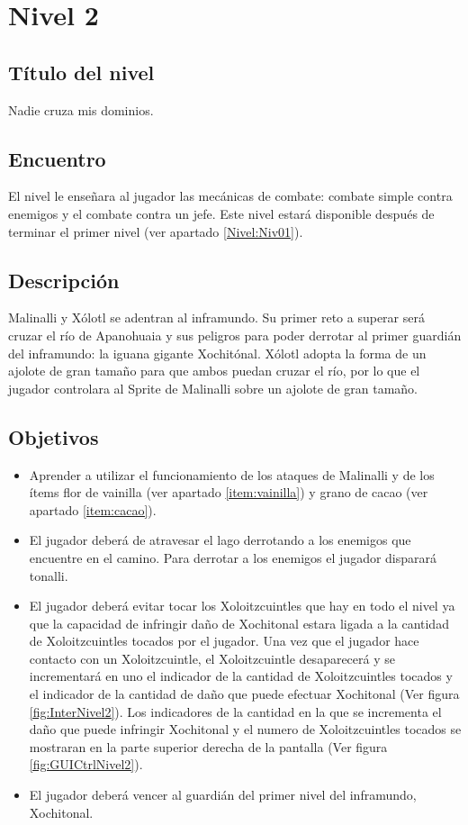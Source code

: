 \section{Nivel 2} \label{Nivel:Niv02}
	\subsection{Título del nivel}
	Nadie cruza mis dominios.
	\subsection{Encuentro}
El nivel le enseñara al jugador las mecánicas de combate: combate simple contra enemigos y el combate contra un jefe. Este nivel estará disponible después de terminar el primer nivel (ver apartado \ref{Nivel:Niv01}).
	\subsection{Descripción}
Malinalli y Xólotl se adentran al inframundo. Su primer reto a superar será cruzar el río de Apanohuaia y sus peligros para poder derrotar al primer guardián del inframundo: la iguana gigante Xochitónal. Xólotl adopta la forma de un ajolote de gran tamaño para que ambos puedan cruzar el río, por lo que el jugador controlara al Sprite de Malinalli sobre un ajolote de gran tamaño. 
	\subsection{Objetivos}
\begin{itemize}
	\item Aprender a utilizar el funcionamiento de los ataques de Malinalli y de los ítems flor de vainilla (ver apartado \ref{item:vainilla}) y grano de cacao (ver apartado \ref{item:cacao}).
	\item El jugador deberá de atravesar el lago derrotando a los enemigos que encuentre en el camino. Para derrotar a los enemigos el jugador disparará tonalli.
	\item El jugador deberá evitar tocar los Xoloitzcuintles que hay en todo el nivel ya que la capacidad de infringir daño de Xochitonal estara ligada a la cantidad de Xoloitzcuintles tocados por el jugador. Una vez que el jugador hace contacto con un Xoloitzcuintle, el Xoloitzcuintle desaparecerá y se incrementará en uno el indicador de la cantidad de Xoloitzcuintles tocados y el indicador de la cantidad de daño que puede efectuar Xochitonal (Ver figura \ref{fig:InterNivel2}). Los indicadores de la cantidad en la que se incrementa el daño que puede infringir Xochitonal y el numero de Xoloitzcuintles tocados se mostraran en la parte superior derecha de la pantalla (Ver figura \ref{fig:GUICtrlNivel2}).
	\item El jugador deberá vencer al guardián del primer nivel del inframundo, Xochitonal.
\end{itemize}

